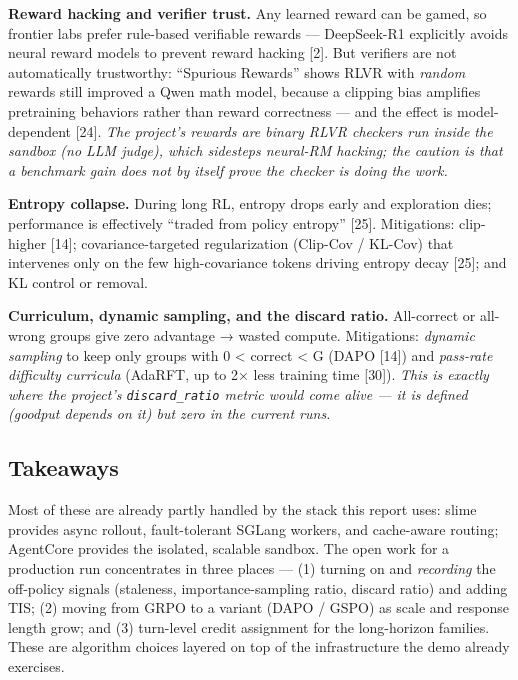 \documentclass[
  paper=a4,
  ,captions=tableheading
]{scrartcl}
\begin{document}
\textbf{Reward hacking and verifier trust.} Any learned reward can be
gamed, so frontier labs prefer rule-based verifiable rewards ---
DeepSeek-R1 explicitly avoids neural reward models to prevent reward
hacking {[}2{]}. But verifiers are not automatically trustworthy:
``Spurious Rewards'' shows RLVR with \emph{random} rewards still
improved a Qwen math model, because a clipping bias amplifies
pretraining behaviors rather than reward correctness --- and the effect
is model-dependent {[}24{]}. \emph{The project's rewards are binary RLVR
checkers run inside the sandbox (no LLM judge), which sidesteps
neural-RM hacking; the caution is that a benchmark gain does not by
itself prove the checker is doing the work.}

\textbf{Entropy collapse.} During long RL, entropy drops early and
exploration dies; performance is effectively ``traded from policy
entropy'' {[}25{]}. Mitigations: clip-higher {[}14{]};
covariance-targeted regularization (Clip-Cov / KL-Cov) that intervenes
only on the few high-covariance tokens driving entropy decay {[}25{]};
and KL control or removal.

\textbf{Curriculum, dynamic sampling, and the discard ratio.}
All-correct or all-wrong groups give zero advantage → wasted compute.
Mitigations: \emph{dynamic sampling} to keep only groups with 0
\textless{} correct \textless{} G (DAPO {[}14{]}) and \emph{pass-rate
difficulty curricula} (AdaRFT, up to 2× less training time {[}30{]}).
\emph{This is exactly where the project's \texttt{discard\_ratio} metric
would come alive --- it is defined (goodput depends on it) but zero in
the current runs.}

\hypertarget{takeaways}{%
\subsection{Takeaways}\label{takeaways}}

Most of these are already partly handled by the stack this report uses:
slime provides async rollout, fault-tolerant SGLang workers, and
cache-aware routing; AgentCore provides the isolated, scalable sandbox.
The open work for a production run concentrates in three places --- (1)
turning on and \emph{recording} the off-policy signals (staleness,
importance-sampling ratio, discard ratio) and adding TIS; (2) moving
from GRPO to a variant (DAPO / GSPO) as scale and response length grow;
and (3) turn-level credit assignment for the long-horizon families.
These are algorithm choices layered on top of the infrastructure the
demo already exercises.
\end{document}
